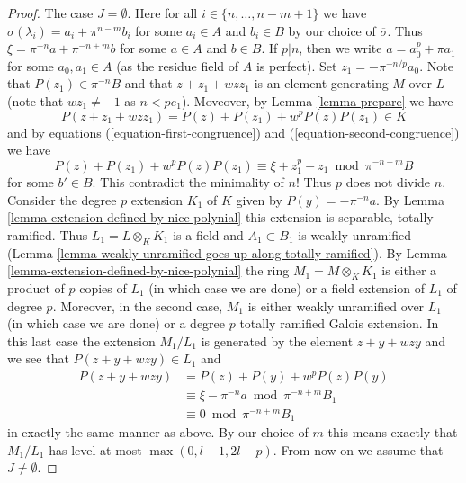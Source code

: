 \begin{proof}
\medskip\noindent
The case $J = \emptyset$. Here for all $i \in \{n, \ldots, n - m + 1\}$
we have $\sigma(\lambda_i) = a_i + \pi^{n - m}b_i$ for some $a_i \in A$
and $b_i \in B$ by our choice of $\overline{\sigma}$. Thus
$\xi = \pi^{-n} a + \pi^{-n + m} b$ for some $a \in A$ and $b \in B$.
If $p | n$, then we write $a = a_0^p + \pi a_1$ for some $a_0, a_1 \in A$
(as the residue field of $A$ is perfect). Set $z_1 = - \pi^{-n/p} a_0$.
Note that $P(z_1) \in \pi^{-n}B$ and that $z + z_1 + w z z_1$ is an
element generating $M$ over $L$ (note that $wz_1 \not = -1$ as
$n < pe_1$). Moveover, by Lemma \ref{lemma-prepare} we have
$$
P(z + z_1 + w z z_1) = P(z) + P(z_1) + w^p P(z) P(z_1) \in K
$$
and by equations (\ref{equation-first-congruence}) and
(\ref{equation-second-congruence}) we have
$$
P(z) + P(z_1) + w^p P(z) P(z_1)
\equiv
\xi + z_1^p - z_1 \bmod \pi^{-n + m}B
$$
for some $b' \in B$. This contradict the minimality of $n$! Thus $p$
does not divide $n$. Consider the degree $p$ extension $K_1$ of $K$ given
by $P(y) = -\pi^{-n}a$. By Lemma \ref{lemma-extension-defined-by-nice-polynial}
this extension is separable, totally ramified. Thus $L_1 = L \otimes_K K_1$
is a field and $A_1 \subset B_1$ is weakly unramified
(Lemma \ref{lemma-weakly-unramified-goes-up-along-totally-ramified}).
By Lemma \ref{lemma-extension-defined-by-nice-polynial}
the ring $M_1 = M \otimes_K K_1$ is either a product of $p$ copies
of $L_1$ (in which case we are done) or a field extension of $L_1$
of degree $p$. Moreover, in the second case, $M_1$ is either weakly unramified
over $L_1$ (in which case we are done) or a degree $p$ totally
ramified Galois extension. In this last case the extension $M_1/L_1$
is generated by the element $z + y + wzy$ and we see that
$P(z + y + wzy) \in L_1$ and
\begin{align*}
P(z + y + wzy)
& = P(z) + P(y) + w^p P(z) P(y) \\
& \equiv
\xi - \pi^{-n}a \bmod \pi^{-n + m}B_1 \\
& \equiv
0 \bmod \pi^{-n + m}B_1
\end{align*}
in exactly the same manner as above. By our choice of $m$ this
means exactly that $M_1/L_1$ has level at most $\max(0, l - 1, 2l - p)$.
From now on we assume that $J \not = \emptyset$.


\end{proof}
